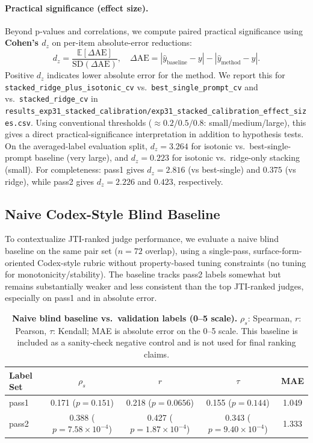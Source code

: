\documentclass{article}
\begin{document}
\paragraph{Practical significance (effect size).}
Beyond p-values and correlations, we compute paired practical significance using \textbf{Cohen's \(d_z\)} on per-item absolute-error reductions:
\[
d_z = \frac{\mathbb{E}[\Delta \mathrm{AE}]}{\mathrm{SD}(\Delta \mathrm{AE})},
\quad
\Delta \mathrm{AE} = | \hat{y}_{\text{baseline}} - y | - | \hat{y}_{\text{method}} - y |.
\]
Positive \(d_z\) indicates lower absolute error for the method.
We report this for
\texttt{stacked\_ridge\_plus\_isotonic\_cv} vs.\ \texttt{best\_single\_prompt\_cv}
and vs.\ \texttt{stacked\_ridge\_cv}
in \texttt{results\_exp31\_stacked\_calibration/exp31\_stacked\_calibration\_effect\_sizes.csv}.
Using conventional thresholds (\(\approx 0.2/0.5/0.8\): small/medium/large), this gives a direct practical-significance interpretation in addition to hypothesis tests.
On the averaged-label evaluation split, \(d_z=3.264\) for isotonic vs.\ best-single-prompt baseline (very large), and \(d_z=0.223\) for isotonic vs.\ ridge-only stacking (small).
For completeness: pass1 gives \(d_z=2.816\) (vs best-single) and \(0.375\) (vs ridge), while pass2 gives \(d_z=2.226\) and \(0.423\), respectively.

\subsection{Naive Codex-Style Blind Baseline}
To contextualize JTI-ranked judge performance, we evaluate a naive blind baseline on the same pair set (\(n=72\) overlap), using a single-pass, surface-form-oriented Codex-style rubric without property-based tuning constraints (no tuning for monotonicity/stability).
The baseline tracks pass2 labels somewhat but remains substantially weaker and less consistent than the top JTI-ranked judges, especially on pass1 and in absolute error.

\begin{table}[t]
  \centering
  \small
  \begin{tabular}{lcccc}
    \toprule
    \textbf{Label Set} & \(\rho_s\)                      & \(r\)                           & \(\tau\)                        & \textbf{MAE} \\
    \midrule
    pass1              & 0.171 (\(p=0.151\))             & 0.218 (\(p=0.0656\))            & 0.155 (\(p=0.144\))             & 1.049        \\
    pass2              & 0.388 (\(p=7.58\times10^{-4}\)) & 0.427 (\(p=1.87\times10^{-4}\)) & 0.343 (\(p=9.40\times10^{-4}\)) & 1.333        \\
    \bottomrule
  \end{tabular}
  \caption{\textbf{Naive blind baseline vs.\ validation labels (0--5 scale).}
    \(\rho_s\): Spearman, \(r\): Pearson, \(\tau\): Kendall; MAE is absolute error on the 0--5 scale.
    This baseline is included as a sanity-check negative control and is not used for final ranking claims.}
  \label{tab:app-naive-blind-baseline}
\end{table}
\end{document}
